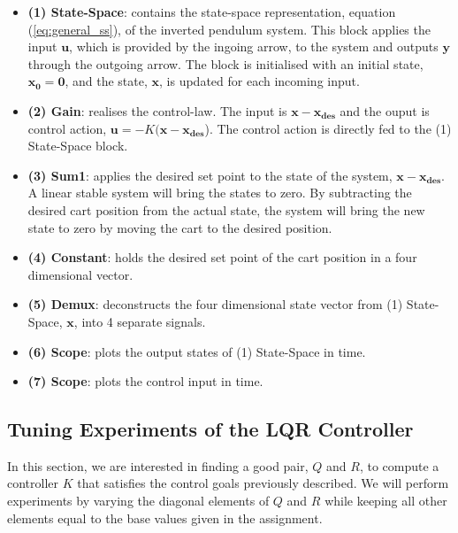 \documentclass[a4paper,10pt]{article}
\theoremstyle{bluehomework}
\numberwithin{equation}{section}
\begin{document}
\begin{itemize}
  \item \textbf{(1) State-Space}: contains the state-space representation, equation (\ref{eq:general_ss}), of the inverted pendulum system. This block applies the input $\mathbf{u}$, which is provided by the ingoing arrow, to the system and outputs $\mathbf{y}$ through the outgoing arrow. The block is initialised with an initial state, $\mathbf{x_0 = 0}$, and the state, $\mathbf{x}$, is updated for each incoming input.     
  \item \textbf{(2) Gain}: realises the control-law. The input is $\mathbf{x - x_{\text{des}}}$ and the ouput is control action, $\mathbf{u} = -K(\mathbf{x-x_{\text{des}}}$). The control action is directly fed to the (1) State-Space block.
  \item \textbf{(3) Sum1}: applies the desired set point to the state of the system, $\mathbf{x-x_{\text{des}}}$. A linear stable system will bring the states to zero. By subtracting the desired cart position from the actual state, the system will bring the new state to zero by moving the cart to the desired position.  
  \item \textbf{(4) Constant}: holds the desired set point of the cart position in a four dimensional vector. 
  \item \textbf{(5) Demux}: deconstructs the four dimensional state vector from (1) State-Space, $\mathbf{x}$, into 4 separate signals. 
  \item \textbf{(6) Scope}: plots the output states of (1) State-Space in time. 
  \item \textbf{(7) Scope}: plots the control input in time.
\end{itemize}

\subsection{Tuning Experiments of the LQR Controller}

In this section, we are interested in finding a good pair, $Q$ and $R$, to compute a controller $K$ that satisfies the control goals previously described. We will perform experiments by varying the diagonal elements of $Q$ and $R$ while keeping all other elements equal to the base values given in the assignment.
\end{document}
